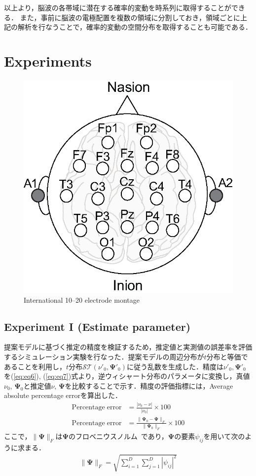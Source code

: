 \documentclass[journal]{IEEEtran}
\begin{document}
以上より，脳波の各帯域に潜在する確率的変動を時系列に取得することができる．
また，事前に脳波の電極配置を複数の領域に分割しておき，領域ごとに上記の解析を行なうことで，確率的変動の空間分布を取得することも可能である．

\section{Experiments}
\begin{figure}[!t]
\centering
\includegraphics[width=0.6\hsize]{figure/electrodes.eps}
\caption{International 10--20 electrode montage}
\label{fig:electrodes}
\end{figure}

\subsection{Experiment I (Estimate parameter) }
提案モデルに基づく推定の精度を検証するため，推定値と実測値の誤差率を評価するシミュレーション実験を行なった．提案モデルの周辺分布が$t$分布と等価であることを利用し，$t$分布$\mathcal {ST}(\nu'_0,\mathbf{\Psi}'_0)$に従う乱数を生成した．精度は$\nu'_0,\mathbf{\Psi}'_0$を(\ref{eq:eq6}), (\ref{eq:eq7})式より，逆ウィシャート分布のパラメータに変換し，真値$\nu_0$, $\mathbf{\Psi}_0$と推定値$\nu$, $\mathbf{\Psi}$を比較することで示す．精度の評価指標には，Average absolute percentage errorを算出した．
\begin{align}%
	\mathrm{Percentage\;error}&=\frac{|\nu_0 -\nu|}{|\nu_0|}\times100 \\
	\mathrm{Percentage\;error}&=\frac{\|\mathbf{\Psi}_0-\mathbf{\Psi}\|_F}{\|\mathbf{\Psi}_0\|_F}\times100
\end{align}
ここで，$\|\mathbf{\Psi}\|_F$は$\mathbf{\Psi}$のフロベニウスノルム~\cite{GeneHowardGolub2013}であり，$\mathbf{\Psi}$の要素${\psi_{ij}}$を用いて次のように求まる．
\begin{eqnarray}%
	\|\mathbf{\Psi}\|_F=\sqrt{\sum_{i=1}^D \sum_{j=1}^D |{\psi_{ij}}|^2}
\end{eqnarray}
\end{document}
